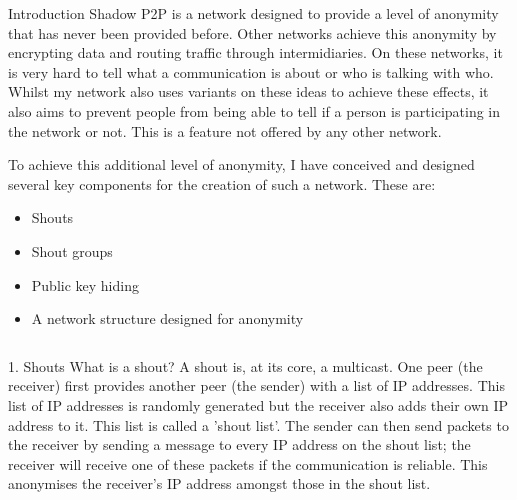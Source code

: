 \documentclass[ %
                    author={Luke Murray},
                supervisor={Dr. Simon Hollis},
                     title={Shadow Peer-to-Peer Networks},
                  subtitle={},
                    degree={MEng},
                      year={2013} ]{poster}
\begin{document}

\begin{frame}{} 

\vfill

\begin{columns}[t]
    \begin{column}{0.900\linewidth}
    \begin{block}{\Large Introduction}
    Shadow P2P is a network designed to provide a level of anonymity that has never been provided before. Other networks achieve this anonymity by encrypting data and routing traffic through intermidiaries. On these networks, it is very hard to tell what a communication is about or who is talking with who. Whilst my network also uses variants on these ideas to achieve these effects, it also aims to prevent people from being able to tell if a person is participating in the network or not. This is a feature not offered by any other network.
    
    To achieve this additional level of anonymity, I have conceived and designed several key components for the creation of such a network. These are:
    \begin{itemize}
    \item Shouts
    \item Shout groups
    \item Public key hiding
    \item A network structure designed for anonymity
    \end{itemize}
    \end{block}
    \end{column}
\end{columns}

\vfill

\begin{columns}[t]
    \begin{column}{0.422\linewidth}
    \begin{block}{\Large 1. Shouts}
    What is a shout? A shout is, at its core, a multicast. One peer (the receiver) first provides another peer (the sender) with a list of IP addresses. This list of IP addresses is randomly generated but the receiver also adds their own IP address to it. This list is called a 'shout list'. The sender can then send packets to the receiver by sending a message to every IP address on the shout list; the receiver will receive one of these packets if the communication is reliable. This anonymises the receiver's IP address amongst those in the shout list.


\end{block}
\end{column}
\end{columns}
\end{frame}
\end{document}
